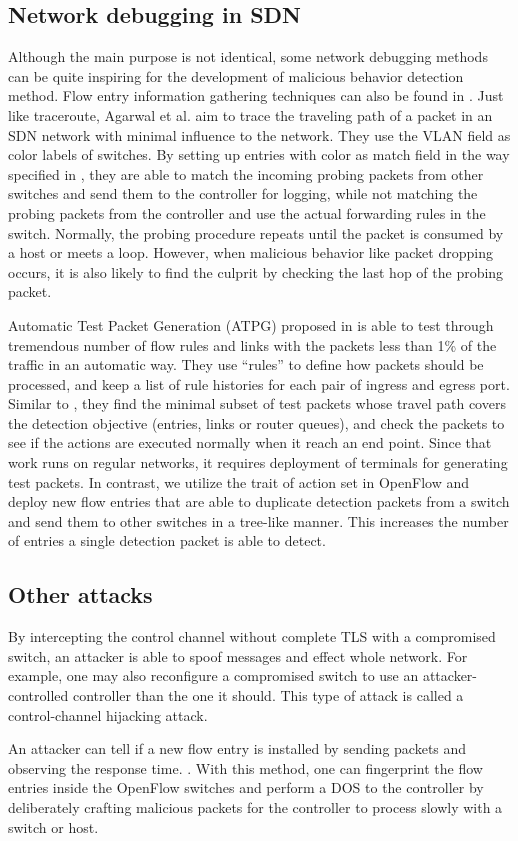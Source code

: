 \subsection{Network debugging in SDN}
Although the main purpose is not identical, some network debugging methods can be quite inspiring for the development of malicious behavior detection method. Flow entry information gathering techniques can also be found in \cite{ARDC14}. Just like traceroute, Agarwal et al. aim to trace the traveling path of a packet in an SDN network with minimal influence to the network. They use the VLAN field as color labels of switches. By setting up entries with color as match field in the way specified in \cite{ARDC14}, they are able to match the incoming probing packets from other switches and send them to the controller for logging, while not matching the probing packets from the controller and use the actual forwarding rules in the switch. Normally, the probing procedure repeats until the packet is consumed by a host or meets a loop. However, when malicious behavior like packet dropping occurs, it is also likely to find the culprit by checking the last hop of the probing packet.

Automatic Test Packet Generation (ATPG) proposed in \cite{ZKVM12} is able to test through tremendous number of flow rules and links with the packets less than 1\% of the traffic in an automatic way. They use ``rules'' to define how packets should be processed, and keep a list of rule histories for each pair of ingress and egress port. Similar to \cite{PJL16}, they find the minimal subset of test packets whose travel path covers the detection objective (entries, links or router queues), and check the packets to see if the actions are executed normally when it reach an end point. Since that work runs on regular networks, it requires deployment of terminals for generating test packets. In contrast, we utilize the trait of action set in OpenFlow and deploy new flow entries that are able to duplicate detection packets from a switch and send them to other switches in a tree-like manner. This increases the number of entries a single detection packet is able to detect. 

\subsection{Other attacks}
By intercepting the control channel without complete TLS with a compromised switch, an attacker is able to spoof messages and effect whole network. For example, one may also reconfigure a compromised switch to use an attacker-controlled controller than the one it should. This type of attack is called a control-channel hijacking attack.

An attacker can tell if a new flow entry is installed by sending packets and observing the response time. \cite{BCKK15}. With this method, one can fingerprint the flow entries inside the OpenFlow switches and perform a DOS to the controller by deliberately crafting malicious packets for the controller to process slowly with a switch or host\cite{AAS14}.